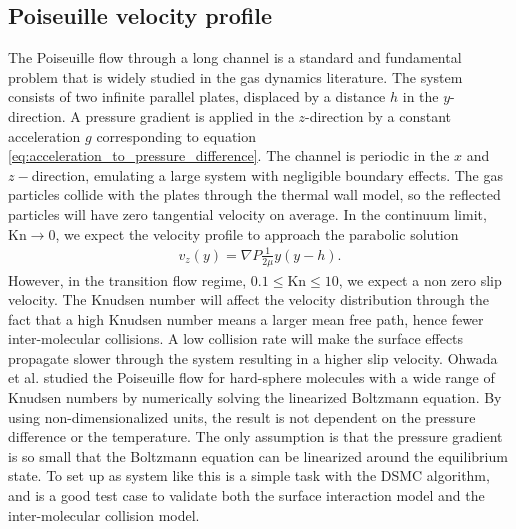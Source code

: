 \subsection{Poiseuille velocity profile}
\label{sec:dsmc_validation_poiseuille}
The Poiseuille flow through a long channel is a standard and fundamental problem that is widely studied in the gas dynamics literature. The system consists of two infinite parallel plates, displaced by a distance $h$ in the $y$-direction. A pressure gradient is applied in the $z$-direction by a constant acceleration $g$ corresponding to equation \ref{eq:acceleration_to_pressure_difference}. The channel is periodic in the $x$ and $z-$direction, emulating a large system with negligible boundary effects. The gas particles collide with the plates through the thermal wall model, so the reflected particles will have zero tangential velocity on average. In the continuum limit, $\text{Kn}\rightarrow 0$, we expect the velocity profile to approach the parabolic solution \cite{batchelor2000introduction}
\begin{align}
	v_z(y) = \nabla P\frac{1}{2\mu}y(y-h).
\end{align}
However, in the transition flow regime, $0.1 \leq \text{Kn} \leq 10$, we expect a non zero slip velocity\cite{morris1992slip}. The Knudsen number will affect the velocity distribution through the fact that a high Knudsen number means a larger mean free path, hence fewer inter-molecular collisions. A low collision rate will make the surface effects propagate slower through the system resulting in a higher slip velocity. Ohwada et al. \cite{ohwada1989numerical} studied the Poiseuille flow for hard-sphere molecules with a wide range of Knudsen numbers by numerically solving the linearized Boltzmann equation. By using non-dimensionalized units, the result is not dependent on the pressure difference or the temperature. The only assumption is that the pressure gradient is so small that the Boltzmann equation can be linearized around the equilibrium state. To set up as system like this is a simple task with the DSMC algorithm, and is a good test case to validate both the surface interaction model and the inter-molecular collision model.

